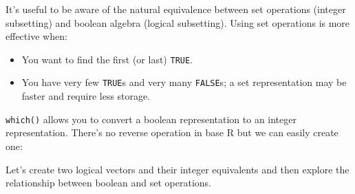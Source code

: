 It's useful to be aware of the natural equivalence between set
operations (integer subsetting) and boolean algebra (logical
subsetting). Using set operations is more effective when:
 

\begin{itemize}
\item
  You want to find the first (or last) \texttt{TRUE}.
\item
  You have very few \texttt{TRUE}s and very many \texttt{FALSE}s; a set
  representation may be faster and require less storage.
\end{itemize}

\texttt{which()} allows you to convert a boolean representation to an
integer representation. There's no reverse operation in base R but we
can easily create one: 

\begin{Shaded}
\begin{Highlighting}[]
\StringTok{ }\NormalTok{(}\NormalTok{) <}\StringTok{ }

\StringTok{ }
  \StringTok{ }\NormalTok{(}
  \StringTok{ }
\NormalTok{\}}
\NormalTok{(}\NormalTok{)}
\end{Highlighting}
\end{Shaded}

Let's create two logical vectors and their integer equivalents and then
explore the relationship between boolean and set operations.

